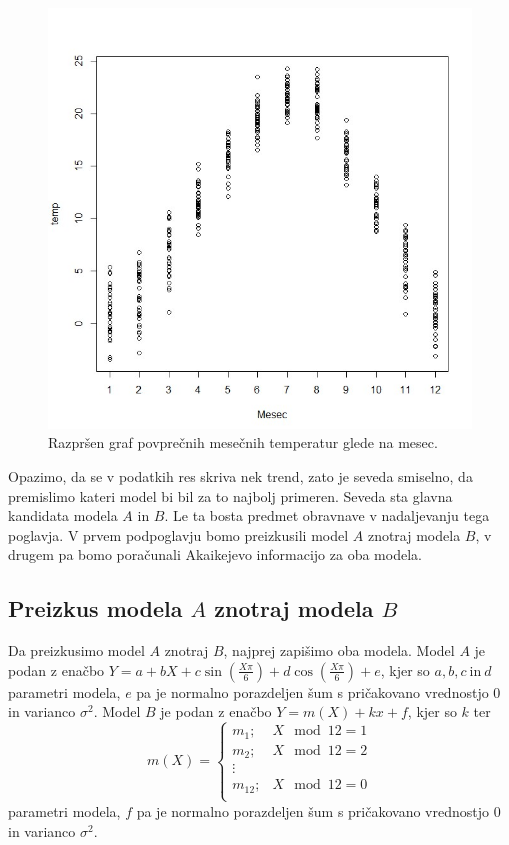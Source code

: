 \documentclass[a4paper, 10pt]{article}
\begin{document}
	\begin{figure}[h!]
		\label{fig: Scatter3}
		\centering
		\includegraphics[scale = 0.4]{Scatter3}
		\caption{Razpršen graf povprečnih mesečnih temperatur glede na mesec.}
	\end{figure}

	Opazimo, da se v podatkih res skriva nek trend, zato je seveda smiselno, da premislimo kateri model bi bil za to najbolj primeren. Seveda sta glavna kandidata modela $A$ in $B$. Le ta bosta predmet obravnave v nadaljevanju tega poglavja. V prvem podpoglavju bomo preizkusili model $A$ znotraj modela $B$, v drugem pa bomo poračunali Akaikejevo informacijo za oba modela.
	
	\subsection{Preizkus modela $A$ znotraj modela $B$}\label{susect: 3A}
	Da preizkusimo model $A$ znotraj $B$, najprej zapišimo oba modela. Model $A$ je podan z enačbo $Y = a + bX + c\sin(\frac{X\pi}{6})+ d\cos(\frac{X\pi}{6}) + e$, kjer so $a, b, c~\text{in}~d$ parametri modela, $e$ pa je normalno porazdeljen šum s pričakovano vrednostjo $0$ in varianco $\sigma^2$. Model $B$ je podan z enačbo $Y = m(X) + kx + f$, kjer so $k$ ter $$m(X) = \begin{cases}
		m_1; & X \mod 12 = 1 \\
		m_2; & X \mod 12 = 2 \\
		\vdots & \\
		m_{12}; & X \mod 12 = 0 \\
	\end{cases}$$ parametri modela, $f$ pa je normalno porazdeljen šum s pričakovano vrednostjo $0$ in varianco $\sigma^2$.
\end{document}
